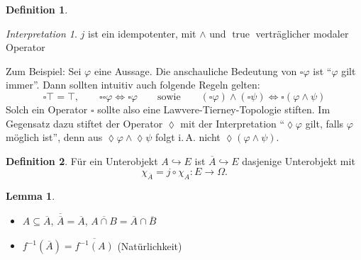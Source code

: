 \documentclass{article}
\theoremstyle{definition}
\newtheorem*{defn}{Definition}
\newtheorem*{lem}{Lemma}
\theoremstyle{remark}
\newtheorem*{interp}{Interpretation}
\DeclareMathOperator{\true}{true} %
\newcommand{\clos}[1]{\overline{{#1}}} %
\begin{document}
\begin{defn}
\begin{center}
\begin{minipage}[t]{0.2 \linewidth}
  \end{minipage}
  \end{center}
\end{defn}

\begin{interp}
  $j$ ist ein idempotenter, mit ${\wedge}$ und $\true$ verträglicher modaler Operator

  Zum Beispiel: Sei $\varphi$ eine Aussage. Die anschauliche Bedeutung von $\square \varphi$ ist "`$\varphi$ gilt immer"'.
  Dann sollten intuitiv auch folgende Regeln gelten:
  \[
    \square \top = \top, \qquad
    \square \square \varphi \iff \square \varphi
    \qquad \text{sowie} \qquad
    (\square \varphi) \wedge (\square \psi) \iff \square (\varphi \wedge \psi)
  \]
  Solch ein Operator $\square$ sollte also eine Lawvere-Tierney-Topologie stiften.
  Im Gegensatz dazu stiftet der Operator $\lozenge$ mit der Interpretation "`$\lozenge \varphi$ gilt, falls $\varphi$ möglich ist"', denn aus $\lozenge \varphi \wedge \lozenge \psi$ folgt i.\,A. nicht $\lozenge (\varphi \wedge \psi)$.
\end{interp}

\begin{defn}
  Für ein Unterobjekt $A \hookrightarrow E$ ist $\clos{A} \hookrightarrow E$ dasjenige Unterobjekt mit
  \[ \chi_{\clos{A}} = j \circ \chi_A : E \to \Omega. \]
\end{defn}

\begin{lem}
  \begin{minipage}[t]{0.8 \linewidth}\begin{itemize}
    \item
      $A \subseteq \clos{A}$, \quad
      $\clos{\clos{A}} = \clos{A}$, \quad
      $\clos{A \cap B} = \clos{A} \cap \clos{B}$
    \item $f^{-1}(\clos{A}) = \clos{f^{-1}(A)}$ \enspace (Natürlichkeit) \qquad
  \end{itemize}\end{minipage}
\end{lem}
\end{document}
